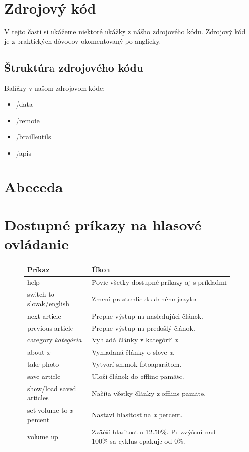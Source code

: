 \documentclass{template/socthesis}
\begin{document}
\begin{appendices}
	
	\chapter{Zdrojový kód}
	V tejto časti si ukážeme niektoré ukážky z nášho zdrojového kódu.
	Zdrojový kód je z praktických dôvodov okomentovaný po anglicky.
	
	\section*{Štruktúra zdrojového kódu}
	Balíčky v našom zdrojovom kóde:
	\begin{itemize}
		\item /data --
		\item /remote
		\item /brailleutils
		\item /apis
	\end{itemize}

	\chapter{Abeceda}
	
	\chapter{Dostupné príkazy na hlasové ovládanie}
	\begin{figure}[htp]	
	\begin{tabularx}{\textwidth}{|l|X| }
		\hline
		\textbf{Príkaz} & \textbf{Úkon} \\
		\hline
		help & Povie všetky dostupné príkazy aj s príkladmi \\
		\hline
		switch to slovak/english & Zmení prostredie do daného jazyka. \\
		\hline
		next article & Prepne výstup na nasledujúci článok. \\
		\hline
		previous article & Prepne výstup na predošlý článok. \\
		\hline
		category \textit{kategória} & Vyhľadá články v kategórií \textit{x} \\
		\hline
		about \textit{x} & Vyhľadaná články o slove \textit{x}. \\
		\hline
		take photo & Vytvorí snímok fotoaparátom. \\
		\hline
		save article & Uloží článok do offline pamäte. \\
		\hline
		show/load saved articles & Načíta všetky články z offline pamäte. \\
		\hline
		set volume to \textit{x} percent & Nastaví hlasitosť na \textit{x} percent. \\
		\hline
		volume up & Zväčší hlasitosť o 12.50\%. Po zvýšení nad 100\% sa cyklus opakuje od 0\%. \\
		\hline
	\end{tabularx}
	\end{figure}



\end{appendices}
\end{document}
